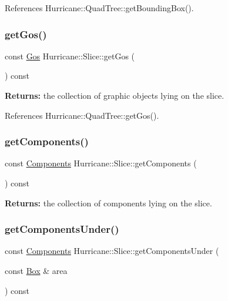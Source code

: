 References Hurricane\+::\+Quad\+Tree\+::get\+Bounding\+Box().

\mbox{\label{classHurricane_1_1Slice_abc257f5b91c01c01a618787fd73db97b}} 
\subsubsection{\texorpdfstring{get\+Gos()}{getGos()}}
{\footnotesize\ttfamily const \mbox{\hyperlink{namespaceHurricane_a4456a34f3bc6766d471c3064ace19759}{Gos}} Hurricane\+::\+Slice\+::get\+Gos (\begin{DoxyParamCaption}{ }\end{DoxyParamCaption}) const\hspace{0.3cm}{\ttfamily [inline]}}

{\bfseries Returns\+:} the collection of graphic objects lying on the slice. 

References Hurricane\+::\+Quad\+Tree\+::get\+Gos().

\mbox{\label{classHurricane_1_1Slice_afe7c766d33e16461c3667af88e64773e}} 
\subsubsection{\texorpdfstring{get\+Components()}{getComponents()}}
{\footnotesize\ttfamily const \mbox{\hyperlink{namespaceHurricane_a7d26d99aeb5dd6d70d51bd35d2473e72}{Components}} Hurricane\+::\+Slice\+::get\+Components (\begin{DoxyParamCaption}{ }\end{DoxyParamCaption}) const}

{\bfseries Returns\+:} the collection of components lying on the slice. \mbox{\label{classHurricane_1_1Slice_af672fc823044869db42a8f2df0672164}} 
\subsubsection{\texorpdfstring{get\+Components\+Under()}{getComponentsUnder()}}
{\footnotesize\ttfamily const \mbox{\hyperlink{namespaceHurricane_a7d26d99aeb5dd6d70d51bd35d2473e72}{Components}} Hurricane\+::\+Slice\+::get\+Components\+Under (\begin{DoxyParamCaption}\item[{const \mbox{\hyperlink{classHurricane_1_1Box}{Box}} \&}]{area }\end{DoxyParamCaption}) const}

